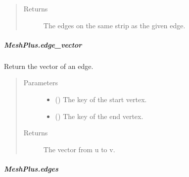 \documentclass[letterpaper,10pt,english]{sphinxmanual}
\begin{document}
\begin{fulllineitems}
\begin{fulllineitems}
\begin{quote}
\begin{description}
\item[{Returns}] \leavevmode
{} \textendash{} The edges on the same strip as the given edge.

\end{description}\end{quote}

\end{fulllineitems}



\subparagraph{MeshPlus.edge\_vector}
\label{\detokenize{api/generated/directional_clustering.mesh.MeshPlus.edge_vector:meshplus-edge-vector}}\label{\detokenize{api/generated/directional_clustering.mesh.MeshPlus.edge_vector::doc}}

\begin{fulllineitems}
\label{\detokenize{api/generated/directional_clustering.mesh.MeshPlus.edge_vector:directional_clustering.mesh.MeshPlus.edge_vector}}
Return the vector of an edge.
\begin{quote}\begin{description}
\item[{Parameters}] \leavevmode\begin{itemize}
\item {} 
 () \textendash{} The key of the start vertex.

\item {} 
 () \textendash{} The key of the end vertex.

\end{itemize}

\item[{Returns}] \leavevmode
{} \textendash{} The vector from u to v.

\end{description}\end{quote}

\end{fulllineitems}



\subparagraph{MeshPlus.edges}
\label{\detokenize{api/generated/directional_clustering.mesh.MeshPlus.edges:meshplus-edges}}\label{\detokenize{api/generated/directional_clustering.mesh.MeshPlus.edges::doc}}


\end{fulllineitems}
\end{document}
